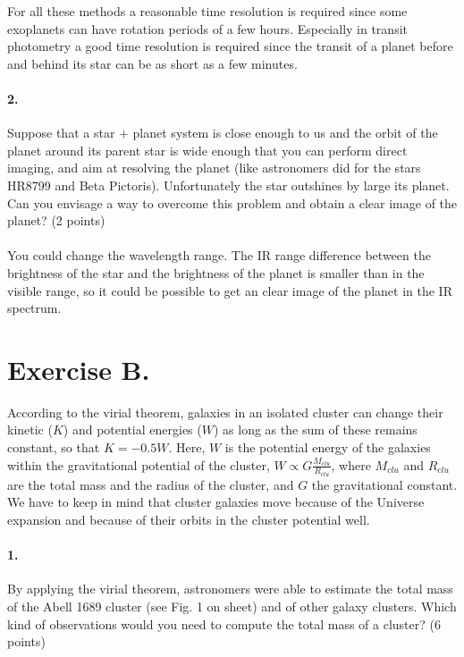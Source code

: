 \documentclass[11pt,a4paper,twoside]{article}
\begin{document}
For all these methods a reasonable time resolution is required since some exoplanets can have rotation periods of a few hours. Especially in transit photometry a good time resolution is required since the transit of a planet before and behind its star can be as short as a few minutes. \\

\paragraph{2.}  Suppose that a star + planet system is close enough to us and the orbit of the planet
around its parent star is wide enough that you can perform direct imaging, and aim at
resolving the planet (like astronomers did for the stars HR8799 and Beta Pictoris).
Unfortunately the star outshines by large its planet. Can you envisage a way to
overcome this problem and obtain a clear image of the planet? (2 points)\\
\\
You could change the wavelength range. The IR range difference between the brightness of the star and the brightness of the planet is smaller than in the visible range, so it could be possible to get an clear image of the planet in the IR spectrum.

\section*{Exercise B.}

According to the virial theorem, galaxies in an isolated cluster can change
their kinetic ($K$) and potential energies ($W$) as long as the sum of these 
remains constant, so that $K = -0.5W$. Here, $W$ is the potential energy of the 
galaxies within the gravitational potential of the cluster, $W \propto 
G \frac{M_{clu}}{R_{clu}}$, where $M_{clu}$ and $R_{clu}$ are the total mass and 
the radius of the cluster, and $G$ the gravitational constant. We have to keep 
in mind that cluster galaxies move because of the Universe expansion and 
because of their orbits in the cluster potential well. \\

\paragraph{1.} By applying the virial theorem, astronomers were able to 
estimate the total mass of the Abell 1689 cluster (see Fig. 1 on sheet) and of 
other galaxy clusters. Which kind of observations would you need to compute 
the total mass of a cluster? (6 points) \\
\end{document}
